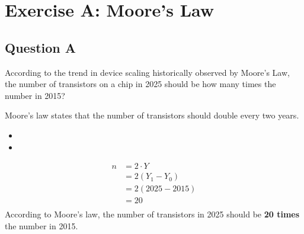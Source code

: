 \newpage
\setcounter{page}{1}
\bigskip

\section*{Exercise A: Moore's Law}
\subsection*{Question A}
According to the trend in device scaling historically observed by Moore’s Law, the number of transistors on a chip in 2025 should be how many times the number in 2015? \cite{hennessey2019computer}
\begin{sol}
	Moore's law states that the number of transistors should double every two years.
	\begin{itemize}
		\item {}
		\item {}
	\end{itemize}
	\begin{align*}
		n & = 2\cdot{Y}    \\
		  & = 2(Y_1-Y_0)   \\
		  & = 2(2025-2015) \\
		  & = 20           \\
	\end{align*}
	According to Moore's law, the number of transistors in 2025 should be \textbf{20 times} the number in 2015.
\end{sol}


